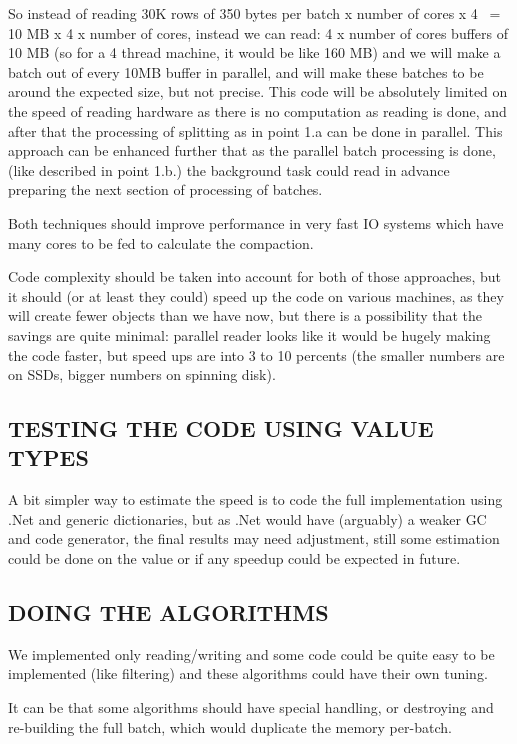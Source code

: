 \documentclass[a4paper,twoside]{article}
\begin{document}
So instead of reading 30K rows of 350 bytes per batch x number of cores x 4 ~= 10 MB x 4 x number of cores, instead we can read:
4 x number of cores buffers of 10 MB (so for a 4 thread machine, it would be like 160 MB) and we will make a batch out of every 10MB buffer in parallel, and will make these batches to be 
around the expected size, but not precise.
This code will be absolutely limited on the speed of reading hardware as there is no computation as reading is done, and after that the processing of splitting 
as in point 1.a can be done in parallel.
This approach can be enhanced further that as the parallel batch processing is done, (like described in point 1.b.)
the background task could read in advance preparing the next section of processing of batches.

Both techniques should improve performance in very fast IO systems which have many cores to be fed to calculate the compaction.

Code complexity should be taken into account for both of those approaches, but it should (or at least they could) speed up the code on various machines, as they will
create fewer objects than we have now, but there is a possibility that the savings are quite minimal: parallel reader looks like it would be hugely making the code
faster, but speed ups are into 3 to 10 percents (the smaller numbers are on SSDs, bigger numbers on spinning disk).

\subsection{\uppercase{Testing the code using Value Types}}\label{subsec:uppercase4}


A bit simpler way to estimate the speed is to code the full implementation using .Net and generic dictionaries, but as .Net would have (arguably) a weaker GC and code generator, the final results may need adjustment, still some estimation could be done on the value or if any speedup could be expected in future.

\subsection{\uppercase{Doing the algorithms}}\label{subsec:uppercase3}

We implemented only reading/writing and some code could be quite easy to be implemented (like filtering) and these algorithms could have their own tuning. 

It can be that some algorithms should have special handling, or destroying and re-building the full batch, which would duplicate the memory per-batch.
\end{document}
